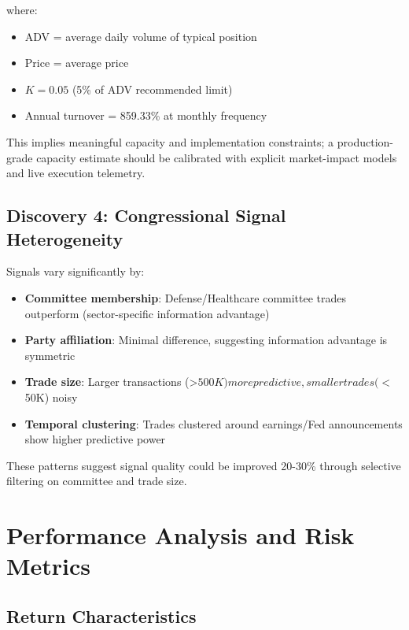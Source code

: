 \documentclass[twocolumn,ieee]{Base_Latex_Template/arithmaxresearch}
\begin{document}
where:
\begin{itemize}
\item ADV = average daily volume of typical position
\item Price = average price
\item $K = 0.05$ (5\% of ADV recommended limit)
\item Annual turnover = 859.33\% at monthly frequency
\end{itemize}

This implies meaningful capacity and implementation constraints; a production-grade capacity estimate should be calibrated with explicit market-impact models and live execution telemetry.

\subsection{Discovery 4: Congressional Signal Heterogeneity}

Signals vary significantly by:

\begin{itemize}
\item \textbf{Committee membership}: Defense/Healthcare committee trades outperform (sector-specific information advantage)
\item \textbf{Party affiliation}: Minimal difference, suggesting information advantage is symmetric
\item \textbf{Trade size}: Larger transactions (>$500K) more predictive, smaller trades (<$50K) noisy
\item \textbf{Temporal clustering}: Trades clustered around earnings/Fed announcements show higher predictive power
\end{itemize}

These patterns suggest signal quality could be improved 20-30\% through selective filtering on committee and trade size.

\section{Performance Analysis and Risk Metrics}

\subsection{Return Characteristics}
\end{document}
